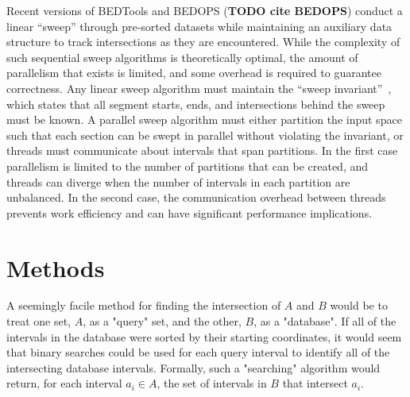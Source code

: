 \documentclass{bioinfo}
\begin{document}
        Recent versions of BEDTools and BEDOPS (\textbf{TODO cite BEDOPS}) conduct a
        linear ``sweep'' through pre-sorted datasets while maintaining an auxiliary
        data structure to track intersections as they are encountered. While the
        complexity of such sequential sweep algorithms is theoretically optimal, the 
        amount of parallelism that exists is limited, and some overhead is required to
        guarantee correctness.  Any linear sweep algorithm must maintain the ``sweep
        invariant''~\cite{mckenney2009}, which states that all segment starts, ends, 
        and intersections behind the sweep must be known.  A parallel sweep algorithm
        must either partition the input space such that each section can be swept in
        parallel without violating the invariant, or threads must communicate 
        about intervals that span partitions.  In the first case parallelism is limited
        to the number of partitions that can be created, and threads can diverge when 
        the number of intervals in each partition are unbalanced.  In the second case,
        the communication overhead between threads prevents work efficiency and can 
        have significant performance implications.


        \section{Methods}
        
        
        A seemingly facile method for finding the intersection of
        $A$ and $B$ would be to treat one set, $A$, as a "query" set, and the
        other, $B$, as a "database". If all of the intervals in the 
        database were sorted by their starting coordinates, it would seem that binary
        searches could be used for each query interval to identify all of the intersecting
        database intervals. Formally, such a "searching" algorithm would return,
        for each interval $a_i \in A$, the set of intervals in $B$ that intersect $a_i$.
\end{document}
